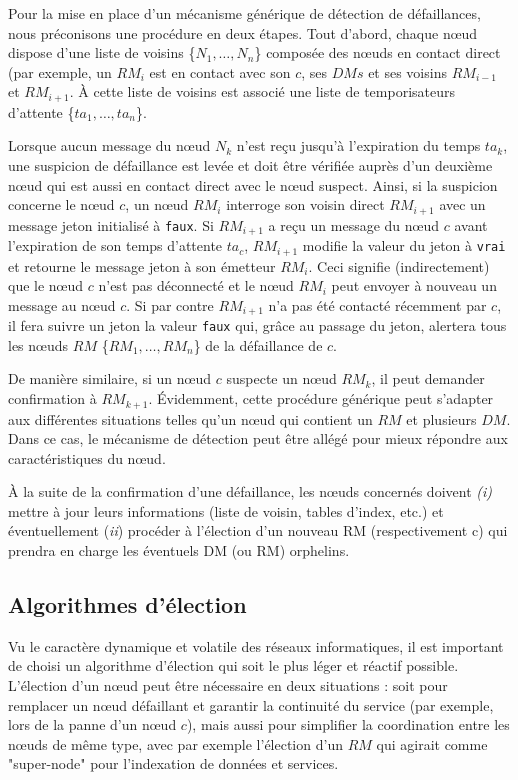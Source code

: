 Pour la mise en place d'un mécanisme générique de détection de défaillances, nous préconisons une procédure en deux étapes. 
Tout d'abord, chaque n{\oe}ud dispose d'une liste de voisins \{$N_1,…,N_n$\} composée des n{\oe}uds en contact direct (par exemple, un $RM_i$ est en contact avec son $c$, ses $DMs$ et ses voisins $RM_{i-1}$ et $RM_{i+1}$. À cette liste de voisins est associé une liste de temporisateurs d'attente \{$ta_1,…,ta_n$\}. 

Lorsque aucun message du n{\oe}ud $N_k$ n'est reçu jusqu'à l'expiration du temps $ta_k$, une suspicion de défaillance est levée et doit être vérifiée auprès d'un deuxième n{\oe}ud qui est aussi en contact direct avec le n{\oe}ud suspect. Ainsi, si la suspicion concerne le n{\oe}ud $c$, un n{\oe}ud $RM_i$ interroge son voisin direct $RM_{i+1}$ avec un message jeton initialisé à \texttt{faux}. Si $RM_{i+1}$ a reçu un message du n{\oe}ud $c$ avant l'expiration de son temps d'attente $ta_c$, $RM_{i+1}$ modifie la valeur du jeton à \texttt{vrai} et retourne le message jeton à son émetteur $RM_i$. Ceci signifie (indirectement) que le n{\oe}ud $c$ n'est pas déconnecté et le n{\oe}ud $RM_i$ peut envoyer à nouveau un message au n{\oe}ud $c$. Si par contre $RM_{i+1}$ n'a pas été contacté récemment par $c$, il fera suivre un jeton la valeur \texttt{faux} qui, grâce au passage du jeton, alertera tous les n{\oe}uds $RM$ \{$RM_1,…,RM_n$\} de la défaillance de $c$.

De manière similaire, si un n{\oe}ud $c$ suspecte un n{\oe}ud $RM_k$, il peut demander confirmation à $RM_{k+1}$. Évidemment, cette procédure générique peut s'adapter aux différentes situations telles qu'un n{\oe}ud qui contient un $RM$ et plusieurs $DM$. Dans ce cas, le mécanisme de détection peut être allégé pour mieux répondre aux caractéristiques du n{\oe}ud. 

À la suite de la confirmation d'une défaillance, les n{\oe}uds concernés doivent \textit{(i)} mettre à jour leurs informations (liste de voisin, tables d'index, etc.) et éventuellement (\textit{ii}) procéder à l'élection d'un nouveau RM (respectivement c) qui prendra en charge les éventuels DM (ou RM) orphelins.  

\subsection{Algorithmes d'élection\label{sec:election}}

Vu le caractère dynamique et volatile des réseaux informatiques, il est important de choisi un algorithme d'élection qui soit le plus léger et réactif possible. L'élection d'un n{\oe}ud peut être nécessaire en deux situations : soit pour remplacer un n{\oe}ud défaillant et garantir la continuité du service (par exemple, lors de la panne d'un n{\oe}ud $c$), mais aussi pour simplifier la coordination entre les n{\oe}uds de même type, avec par exemple l'élection d'un $RM$ qui agirait comme "super-node" pour l'indexation de données et services. 

